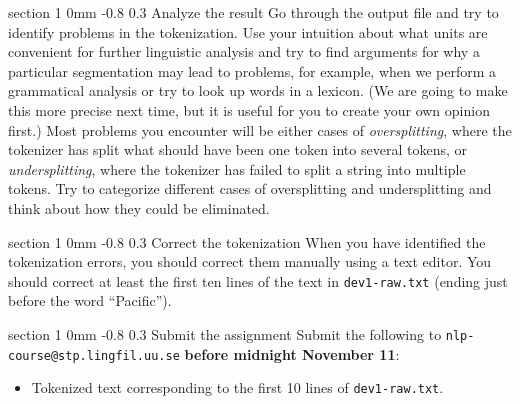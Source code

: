 \documentclass[11pt]{article}
\makeatletter
\newcommand{\newsec}[2]{\section{#1}\label{sec:#2}\noindent}
\renewcommand{\section}{\@startsection
{section}%
{1}%
{0mm}%
{-0.8\baselineskip}%
{0.3\baselineskip}%
{\bfseries\large}}%
\makeatother
\begin{document}
\newsec{Analyze the result}{analyse}%
Go through the output file and try to identify problems in the tokenization. Use your intuition about what units are convenient for further linguistic analysis
and try to find arguments for why a particular segmentation may lead to problems, for example, when we perform a grammatical analysis or try
to look up words in a lexicon. (We are going to make this more precise next time, but it is useful for you to create your own opinion first.)
Most problems you encounter will be either cases of \emph{oversplitting}, where the tokenizer has split what should have been one token into 
several tokens, or \emph{undersplitting}, where the tokenizer has failed to split a string into multiple tokens. Try to categorize different cases of oversplitting
and undersplitting and think about how they could be eliminated.

\newsec{Correct the tokenization}{correct}%
When you have identified the tokenization errors, you should correct them manually using a text editor. You should correct at least the first ten lines
of the text in {\tt dev1-raw.txt} (ending just before the word ``Pacific'').

\newsec{Submit the assignment}{submit}%
Submit the following to {\tt nlp-course@stp.lingfil.uu.se} {\bf before midnight November 11}: 
\begin{itemize}[noitemsep,topsep=0.2cm]
\item Tokenized text corresponding to the first 10 lines of {\tt dev1-raw.txt}.
\end{itemize}

\end{document}
